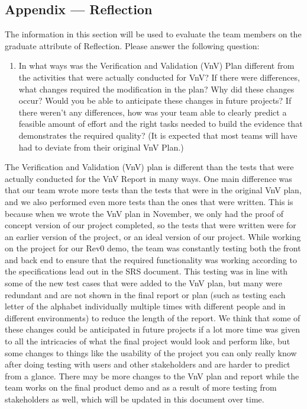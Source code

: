 \documentclass[12pt, titlepage]{article}
\begin{document}
\subsection{Appendix --- Reflection}

The information in this section will be used to evaluate the team members on the
graduate attribute of Reflection.  Please answer the following question:

\begin{enumerate}
  \item In what ways was the Verification and Validation (VnV) Plan different
  from the activities that were actually conducted for VnV?  If there were
  differences, what changes required the modification in the plan?  Why did
  these changes occur?  Would you be able to anticipate these changes in future
  projects?  If there weren't any differences, how was your team able to clearly
  predict a feasible amount of effort and the right tasks needed to build the
  evidence that demonstrates the required quality?  (It is expected that most
  teams will have had to deviate from their original VnV Plan.)
\end{enumerate}

The Verification and Validation (VnV) plan is different than the tests that were actually conducted for the VnV Report in many ways. One main difference was that our team wrote more tests than the tests that were in the original VnV plan, and we also performed even more tests than the ones that were written. This is because when we wrote the VnV plan in November, we only had the proof of concept version of our project completed, so the tests that were written were for an earlier version of the project, or an ideal version of our project. While working on the project for our Rev0 demo, the team was constantly testing both the front and back end to ensure that the required functionality was working according to the specifications lead out in the SRS document. This testing was in line with some of the new test cases that were added to the VnV plan, but many were redundant and are not shown in the final report or plan (such as testing each letter of the alphabet individually multiple times with different people and in different environments) to reduce the length of the report. We think that some of these changes could be anticipated in future projects if a lot more time was given to all the intricacies of what the final project would look and perform like, but some changes to things like the usability of the project you can only really know after doing testing with users and other stakeholders and are harder to predict from a glance. There may be more changes to the VnV plan and report while the team works on the final product demo and as a result of more testing from stakeholders as well, which will be updated in this document over time. 
\end{document}
